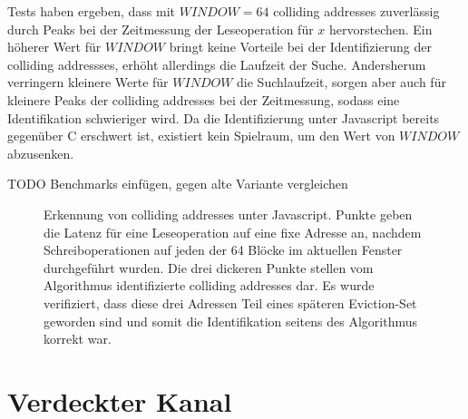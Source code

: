 Tests haben ergeben, dass mit $WINDOW=64$ colliding addresses zuverlässig durch Peaks bei der Zeitmessung der Leseoperation für $x$ hervorstechen.
Ein höherer Wert für $WINDOW$ bringt keine Vorteile bei der Identifizierung der colliding addressses, erhöht allerdings die Laufzeit der Suche.
Andersherum verringern kleinere Werte für $WINDOW$ die Suchlaufzeit, sorgen aber auch für kleinere Peaks der colliding addresses bei der Zeitmessung, sodass eine Identifikation schwieriger wird.
Da die Identifizierung unter Javascript bereits gegenüber C erschwert ist, existiert kein Spielraum, um den Wert von $WINDOW$ abzusenken. 

TODO Benchmarks einfügen, gegen alte Variante vergleichen







\label{fig:colliding_addresses_js_measurement}
\begin{figure}[h]
\centering
\begin{scaletikzpicturetowidth}{\textwidth}

\end{scaletikzpicturetowidth}
\caption{Erkennung von colliding addresses unter Javascript. Punkte geben die Latenz für eine Leseoperation auf eine fixe Adresse an, nachdem Schreiboperationen auf jeden der 64 Blöcke im aktuellen Fenster durchgeführt wurden. Die drei dickeren Punkte stellen vom Algorithmus identifizierte colliding addresses dar. Es wurde verifiziert, dass diese drei Adressen Teil eines späteren Eviction-Set geworden sind und somit die Identifikation seitens des Algorithmus korrekt war.}
\end{figure}




\section{Verdeckter Kanal}

